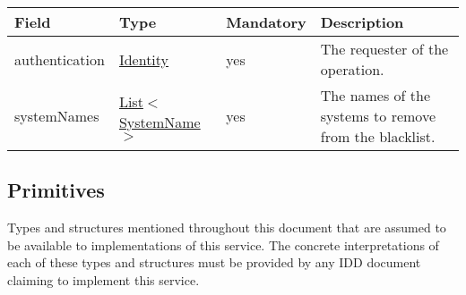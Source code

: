 \documentclass[a4paper]{arrowhead}
\newcommand{\pref}[1]{{\textcolor{ArrowheadGrey}{\hyperref[sec:model:primitives:#1]{#1}}}}
\begin{document}
 
\begin{table}[ht!]
\begin{tabularx}{\textwidth}{| p{3cm} | p{3.5cm} | p{1.75cm} | X |} \hline
\rowcolor{gray!33} Field & Type & Mandatory & Description \\ \hline
authentication & \hyperref[sec:model:Identity]{Identity} & yes & The requester of the operation. \\ \hline
systemNames & \pref{List}$<$\pref{SystemName}$>$ & yes & The names of the systems to remove from the blacklist. \\ \hline
\end{tabularx}
\end{table}

\clearpage

\subsection{Primitives}
\label{sec:model:primitives}

Types and structures mentioned throughout this document that are assumed to be available to implementations of this service.
The concrete interpretations of each of these types and structures must be provided by any IDD document claiming to implement this service.
\end{document}
